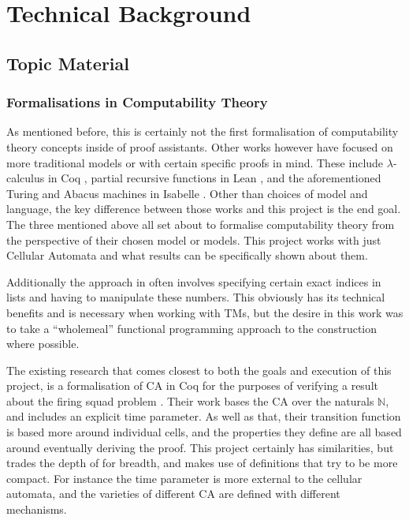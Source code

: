 \chapter{Technical Background}

\section{Topic Material}

\subsection{Formalisations in Computability Theory}

As mentioned before,
this is certainly not the first formalisation of computability theory concepts inside of proof assistants.
Other works however have focused on more traditional models or with certain specific proofs in mind.
These include $\lambda$-calculus in Coq \cite{forster},
partial recursive functions in Lean \cite{carneiro},
and the aforementioned Turing and Abacus machines in Isabelle \cite{urban}.
Other than choices of model and language,
the key difference between those works and this project is the end goal.
The three mentioned above all set about to formalise computability theory from the perspective of their chosen model or models.
This project works with just Cellular Automata and what results can be specifically shown about them.

Additionally the approach in \cite{urban} often involves specifying certain exact indices in lists and having to manipulate these numbers.
This obviously has its technical benefits and is necessary when working with TMs,
but the desire in this work was to take a ``wholemeal'' functional programming approach to the construction where possible.

The existing research that comes closest to both the goals and execution of this project,
is a formalisation of CA in Coq for the purposes of verifying a result about the firing squad problem \cite{firing}.
Their work bases the CA over the naturals $\mathbb{N}$,
and includes an explicit time parameter.
As well as that,
their transition function is based more around individual cells,
and the properties they define are all based around eventually deriving the proof.
This project certainly has similarities,
but trades the depth of \cite{firing} for breadth,
and makes use of definitions that try to be more compact.
For instance the time parameter is more external to the cellular automata, and the varieties of different CA are defined with different mechanisms.


